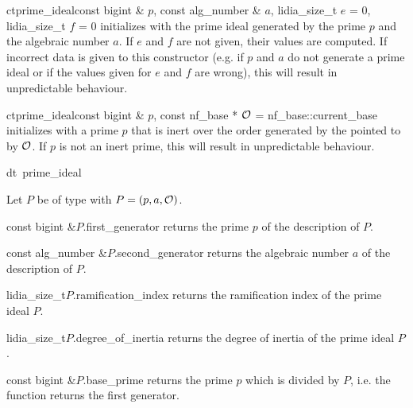 \begin{fcode}{ct}{prime_ideal}{const bigint & $p$, const alg_number & $a$,
    lidia_size_t $e$ = 0, lidia_size_t $f$ = 0}%
  initializes with the prime ideal generated by the prime $p$ and the algebraic number $a$.  If
  $e$ and $f$ are not given, their values are computed.  If incorrect data is given to this
  constructor (e.g. if $p$ and $a$ do not generate a prime ideal or if the values given for $e$
  and $f$ are wrong), this will result in unpredictable behaviour.
\end{fcode}

\begin{fcode}{ct}{prime_ideal}{const bigint & $p$, const nf_base * $\mathcal{O}$ = nf_base::current_base}
  initializes with a prime $p$ that is inert over the order generated by the 
  pointed to by $\mathcal{O}$.  If $p$ is not an inert prime, this will result in unpredictable behaviour.
\end{fcode}

\begin{fcode}{dt}{~prime_ideal}{}
\end{fcode}



\ACCS

Let $P$ be of type  with $P = (p, a, \mathcal{O})$.

\begin{cfcode}{const bigint &}{$P$.first_generator}{}
  returns the prime $p$ of the description of $P$.
\end{cfcode}

\begin{cfcode}{const alg_number &}{$P$.second_generator}{}
  returns the algebraic number $a$ of the description of $P$.
\end{cfcode}

\begin{cfcode}{lidia_size_t}{$P$.ramification_index}{}
  returns the ramification index of the prime ideal $P$.
\end{cfcode}

\begin{cfcode}{lidia_size_t}{$P$.degree_of_inertia}{}
  returns the degree of inertia of the prime ideal $P$.
\end{cfcode}

\begin{cfcode}{const bigint &}{$P$.base_prime}{}
  returns the prime $p$ which is divided by $P$, i.e. the function returns the first generator.
\end{cfcode}


